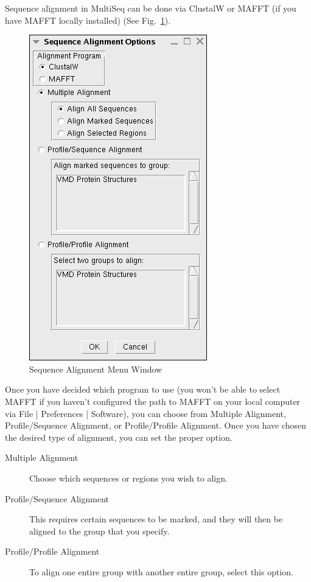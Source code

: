 Sequence alignment in MultiSeq can be done via ClustalW or MAFFT (if you
have MAFFT locally installed) (See Fig.~\ref{seqAlignMenuWindow}).

 \begin{figure}
 \centerline{\includegraphics {./pictures/sequenceAlignmentMenu.jpg}}
 \caption{Sequence Alignment Menu Window}
\label{seqAlignMenuWindow}
\end{figure}

Once you have decided which program to use (you won't be able to select
MAFFT if you haven't configured the path to MAFFT on your local computer
via \textsf{File} | \textsf{Preferences} | \textsf{Software}), you can 
choose from 
Multiple Alignment, Profile/Sequence Alignment, or
Profile/Profile Alignment.  Once you have chosen the desired type
of alignment, you can set the proper option.

\begin{description}
     \item[Multiple Alignment]  Choose which sequences or regions you
     wish to align.
     \item[Profile/Sequence Alignment] This requires certain sequences
     to be marked, and they will then be aligned to the group that you
     specify.
     \item[Profile/Profile Alignment] To align one entire group with
     another entire group, select this option.
\end{description}

